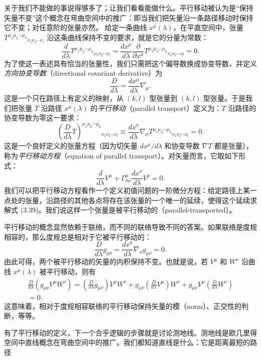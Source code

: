关于我们不能做的事说得够多了；让我们看看能做什么。平行移动被认为是“保持矢量不变”这个概念在弯曲空间中的推广：即当我们把矢量沿一条路径移动时保持它不变；对任意阶的张量亦然。
给定一条曲线 $x^\mu(\lambda)$，在平直空间中，张量 $T^{\mu_1\mu_2\cdots\mu_k}{}_{\nu_1\nu_2\cdots\nu_l}$ 沿这条曲线保持不变的要求，就是它的分量为常数：
\begin{equation*}
\frac{d}{d\lambda}T^{\mu_1\mu_2\cdots\mu_k}{}_{\nu_1\nu_2\cdots\nu_l} = \frac{dx^\mu}{d\lambda}\frac{\partial}{\partial x^\mu}T^{\mu_1\mu_2\cdots\mu_k}{}_{\nu_1\nu_2\cdots\nu_l} = 0.
\end{equation*}
为了使这一表述具有恰当的张量性，我们只需把这个偏导数换成协变导数，并定义\emph{方向协变导数}（directional covariant derivative）为
\begin{equation*}
\frac{D}{d\lambda} = \frac{dx^\mu}{d\lambda}\nabla_\mu.
\tag{3.38}
\end{equation*}
这是一个只在路径上有定义的映射，从 $(k,l)$ 型张量到 $(k,l)$ 型张量。于是我们把张量 $T$ 沿路径 $x^\mu(\lambda)$ 的\emph{平行移动}（parallel transport）定义为：$T$ 沿路径的协变导数为零这一要求：
\begin{equation*}
\left(\frac{D}{d\lambda}T\right)^{\mu_1\mu_2\cdots\mu_k}{}_{\nu_1\nu_2\cdots\nu_l} \equiv \frac{dx^\sigma}{d\lambda}\nabla_\sigma T^{\mu_1\mu_2\cdots\mu_k}{}_{\nu_1\nu_2\cdots\nu_l} = 0.
\tag{3.39}
\end{equation*}
这是一个良好定义的张量方程（因为切矢量 $dx^\mu/d\lambda$ 和协变导数 $\nabla T$ 都是张量），称为\emph{平行移动方程}（equation of parallel transport）。对矢量而言，它取如下形式：
\begin{equation*}
\frac{d}{d\lambda}V^\mu + \Gamma^\mu_{\sigma\rho}\frac{dx^\sigma}{d\lambda}V^\rho = 0.
\tag{3.40}
\end{equation*}
我们可以把平行移动方程看作一个定义初值问题的一阶微分方程：给定路径上某一点处的张量，沿路径的其他各点将存在该张量的一个唯一的延续，使得这个延续求解式 (3.39)。我们说这样一个张量是被平行移动的（parallel-transported）。

平行移动的概念显然依赖于联络，而不同的联络导致不同的答案。如果联络是度规相容的，那么度规总是相对于它被平行移动的：
\begin{equation*}
\frac{D}{d\lambda}g_{\mu\nu} = \frac{dx^\sigma}{d\lambda}\nabla_\sigma g_{\mu\nu} = 0.
\tag{3.41}
\end{equation*}
由此可得，两个被平行移动的矢量的内积保持不变。也就是说，若 $V^\mu$ 和 $W^\nu$ 沿曲线 $x^\mu(\lambda)$ 被平行移动，则有
\begin{align*}
\frac{D}{d\lambda}(g_{\mu\nu}V^\mu W^\nu) = \left(\frac{D}{d\lambda}g_{\mu\nu}\right)V^\mu W^\nu + g_{\mu\nu}\left(\frac{D}{d\lambda}V^\mu\right)W^\nu + g_{\mu\nu}V^\mu\left(\frac{D}{d\lambda}W^\nu\right)\\
= 0.
\tag{3.42}
\end{align*}
这意味着，相对于度规相容联络的平行移动保持矢量的模（norm）、正交性的判断，等等。

有了平行移动的定义，下一个合乎逻辑的步骤就是讨论测地线。测地线是欧几里得空间中直线概念在弯曲空间中的推广。我们都知道直线是什么：它是距离最短的路径

